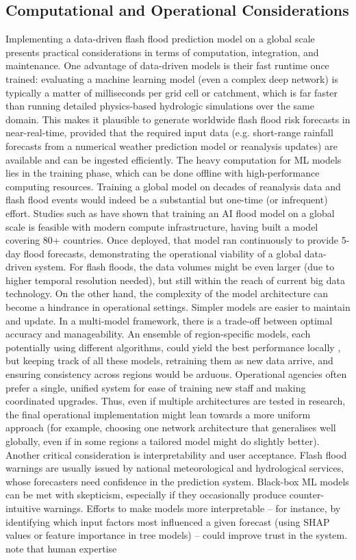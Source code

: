 \subsection{Computational and Operational Considerations} 
Implementing a data-driven flash flood prediction model on a global scale presents practical considerations in terms of computation, integration, and maintenance. One advantage of data-driven models is their fast runtime once trained: evaluating a machine learning model (even a complex deep network) is typically a matter of milliseconds per grid cell or catchment, which is far faster than running detailed physics-based hydrologic simulations over the same domain. This makes it plausible to generate worldwide flash flood risk forecasts in near-real-time, provided that the required input data (e.g. short-range rainfall forecasts from a numerical weather prediction model or reanalysis updates) are available and can be ingested efficiently. The heavy computation for ML models lies in the training phase, which can be done offline with high-performance computing resources. Training a global model on decades of reanalysis data and flash flood events would indeed be a substantial but one-time (or infrequent) effort. Studies such as \citet{Gilon2024} have shown that training an AI flood model on a global scale is feasible with modern compute infrastructure, having built a model covering 80+ countries. Once deployed, that model ran continuously to provide 5-day flood forecasts, demonstrating the operational viability of a global data-driven system. For flash floods, the data volumes might be even larger (due to higher temporal resolution needed), but still within the reach of current big data technology. On the other hand, the complexity of the model architecture can become a hindrance in operational settings. Simpler models are easier to maintain and update. In a multi-model framework, there is a trade-off between optimal accuracy and manageability. An ensemble of region-specific models, each potentially using different algorithms, could yield the best performance locally \citep{Soares2025}, but keeping track of all these models, retraining them as new data arrive, and ensuring consistency across regions would be arduous. Operational agencies often prefer a single, unified system for ease of training new staff and making coordinated upgrades. Thus, even if multiple architectures are tested in research, the final operational implementation might lean towards a more uniform approach (for example, choosing one network architecture that generalises well globally, even if in some regions a tailored model might do slightly better). Another critical consideration is interpretability and user acceptance. Flash flood warnings are usually issued by national meteorological and hydrological services, whose forecasters need confidence in the prediction system. Black-box ML models can be met with skepticism, especially if they occasionally produce counter-intuitive warnings. Efforts to make models more interpretable – for instance, by identifying which input factors most influenced a given forecast (using SHAP values or feature importance in tree models) – could improve trust in the system. \citet{Brunner2021} note that human expertise 